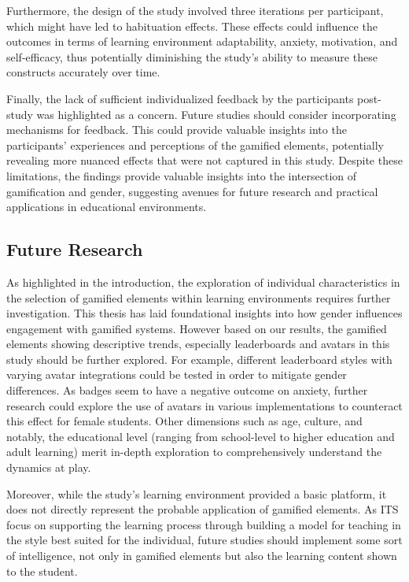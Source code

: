Furthermore, the design of the study involved three iterations per participant, which might have led to habituation effects. These effects could influence the outcomes in terms of learning environment adaptability, anxiety, motivation, and self-efficacy, thus potentially diminishing the study's ability to measure these constructs accurately over time.

Finally, the lack of sufficient individualized feedback by the participants post-study was highlighted as a concern. Future studies should consider incorporating mechanisms for feedback. This could provide valuable insights into the participants' experiences and perceptions of the gamified elements, potentially revealing more nuanced effects that were not captured in this study.
Despite these limitations, the findings provide valuable insights into the intersection of gamification and gender, suggesting avenues for future research and practical applications in educational environments.

\subsection{Future Research}
As highlighted in the introduction, the exploration of individual characteristics in the selection of gamified elements within learning environments requires further investigation.
This thesis has laid foundational insights into how gender influences engagement with gamified systems. 
However based on our results, the gamified elements showing descriptive trends, especially leaderboards and avatars in this study should be further explored.
For example, different leaderboard styles with varying avatar integrations could be tested in order to mitigate gender differences.
As badges seem to have a negative outcome on anxiety, further research could explore the use of avatars in various implementations to counteract this effect for female students.
Other dimensions such as age, culture, and notably, the educational level (ranging from school-level to higher education and adult learning) merit in-depth exploration to comprehensively understand the dynamics at play.

Moreover, while the study's learning environment provided a basic platform, it does not directly represent the probable application of gamified elements. As ITS focus on supporting the learning process through building a model for teaching in the style best suited for the individual, future studies should implement some sort of intelligence, not only in gamified elements but also the learning content shown to the student.

